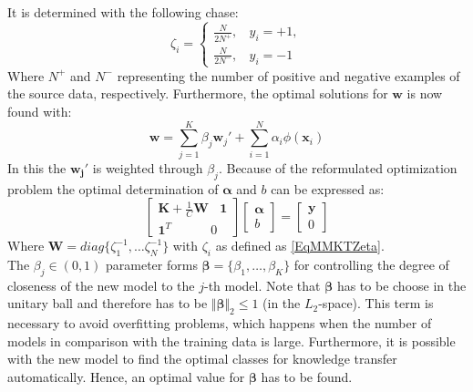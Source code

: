 It is determined with the following chase:\cite{Tommasi.}
\begin{equation}\label{EqMMKTZeta}
	\zeta_i = \begin{cases}
			\frac{N}{2N^+}, \>\>\>\> y_i = +1,\\
			\frac{N}{2N^-}, \>\>\>\> y_i = -1
	\end{cases}
\end{equation} 
Where $N^+$ and $N^-$ representing the number of positive and negative examples of the source data, respectively.
Furthermore, the optimal solutions for $\mathbf{w}$ is now found with:\cite{Tommasi.}
\begin{equation}
	\mathbf{w} = \sum_{j=1}^{K}\beta_j\mathbf{w}_j'+\sum_{i=1}^{N}\alpha_i\phi(\mathbf{x}_i)
\end{equation}
In this the $\mathbf{w_j}'$ is weighted through $\beta_j$.
Because of the reformulated optimization problem the optimal determination of $\boldsymbol{\alpha}$ and $b$ can be expressed as:\cite{Tommasi.}
\begin{equation}\label{EqMMKTParaEst}
\begin{bmatrix}
\mathbf{K}+\frac{1}{C}\mathbf{W} \>\>\>\> \mathbf{1}\\
\mathbf{1}^T \>\>\>\>\>\>\>\>\>\>\>\>\>\> 0
\end{bmatrix}
\begin{bmatrix}
\boldsymbol{\alpha}\\
b
\end{bmatrix}
= 
\begin{bmatrix}
\mathbf{y} \\
0
\end{bmatrix}
\end{equation}
Where $\mathbf{W} = diag\{\zeta_1^{-1},\dots\zeta_N^{-1}\}$ with $\zeta_i$ as defined as \eqref{EqMMKTZeta}.\\
The $\beta_j \in (0,1)$ parameter forms $\boldsymbol{\beta} = \{\beta_1,\dots,\beta_K \}$ for controlling the degree of closeness of the new model to the $j$-th model.
Note that $\boldsymbol{\beta}$ has to be choose in the unitary ball and therefore has to be $\Vert\boldsymbol{\beta}\Vert_2\le 1$ (in the $L_2$-space).
This term is necessary to avoid overfitting problems, which happens when the number of models in comparison with the training data is large.
Furthermore, it is possible with the new model to find the optimal classes for knowledge transfer automatically.
Hence, an optimal value for $\boldsymbol{\beta}$ has to be found.\cite{Tommasi.}\\
